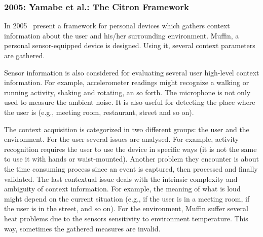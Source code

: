 \subsubsection{2005: Yamabe et al.: The Citron Framework}
\label{sec:yamabe}

In 2005~\citet{yamabe_citron_2005} present a framework for personal devices 
which gathers context information about the user and his/her surrounding 
environment. Muffin, a personal sensor-equipped device is designed. Using it, 
several context parameters are gathered.

Sensor information is also considered for evaluating several user high-level 
context information. For example, accelerometer readings might recognize a 
walking or running activity, shaking and rotating, an so forth. The microphone 
is not only used to measure the ambient noise. It is also useful for detecting 
the place where the user is (e.g., meeting room, restaurant, street and so on).

The context acquisition is categorized in two different groups: the user and 
the environment. For the user several issues are analysed. For example, 
activity recognition requires the user to use the device in specific ways (it 
is not the same to use it with hands or waist-mounted). Another problem they 
encounter is about the time consuming process since an event is captured, then 
processed and finally validated. The last contextual issue deals with the 
intrinsic complexity and ambiguity of context information. For example, the 
meaning of what is loud might depend on the current situation (e.g., if the 
user is in a meeting room, if the user is in the street, and so on). For the 
environment, Muffin suffer several heat problems due to the sensors sensitivity
to environment temperature. This way, sometimes the gathered measures are invalid.

%  
% 
% 
